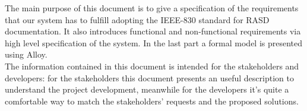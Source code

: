 The main purpose of this document is to give a specification of the requirements that our system has to fulfill adopting the IEEE-830 standard for RASD documentation. 
It also introduces functional and non-functional requirements via high level specification of the system. 
In the last part a formal model is presented using Alloy. 
\\The information contained in this document is intended for the stakeholders and developers: for the stakeholders this document presents an useful description to understand the project development, 
meanwhile for the developers it’s quite a comfortable way to match the stakeholders' requests and the proposed solutions.
